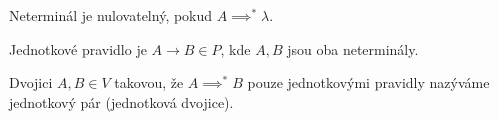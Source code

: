 \documentclass[12pt]{article}                   %
\begin{document}
    \begin{definice}
        Neterminál je nulovatelný, pokud $A \implies^* \lambda$.
    \end{definice}

    \begin{definice}
        Jednotkové pravidlo je $A \rightarrow B \in P$, kde $A, B$ jsou oba neterminály.
    \end{definice}

    \begin{definice}
        Dvojici $A, B \in V$ takovou, že $A \implies^* B$ pouze jednotkovými pravidly nazýváme jednotkový pár (jednotková dvojice).
    \end{definice}
\end{document}
